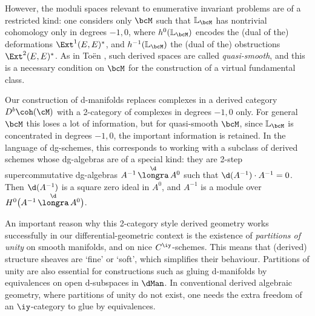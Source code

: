\documentclass{article}
\begin{document}
However, the moduli spaces relevant to enumerative invariant
problems are of a restricted kind: one considers only $\bcM$ such
that ${\mathbb L}_\bcM$ has nontrivial cohomology only in degrees
$-1,0$, where $h^0({\mathbb L}_\bcM)$ encodes the (dual of the)
deformations $\Ext^1(E,E)^*$, and $h^{-1}({\mathbb L}_\bcM)$ the
(dual of the) obstructions $\Ext^2(E,E)^*$. As in To\"en \cite[\S
4.4.3]{Toen}, such derived spaces are called {\it
quasi-smooth}, and
this is a necessary condition on $\bcM$ for the construction of a
virtual fundamental class.

Our construction of d-manifolds replaces complexes in a derived
category $D^b\coh(\cM)$ with a 2-category of complexes in degrees
$-1,0$ only. For general $\bcM$ this loses a lot of information, but
for quasi-smooth $\bcM$, since ${\mathbb L}_\bcM$ is concentrated in
degrees $-1,0$, the important information is retained. In the
language of dg-schemes, this corresponds to working
with a subclass of derived schemes whose dg-algebras are of a
special kind: they are 2-step supercommutative dg-algebras
$A^{-1}\,{\buildrel\d\over \longra}\,A^0$ such that $\d(A^{-1})\cdot
A^{-1}=0$. Then $\d(A^{-1})$ is a square zero ideal in $A^0$, and
$A^{-1}$ is a module over~$H^0\bigl(A^{-1}\,{\buildrel
\d\over\longra}\,A^0\bigr)$.

An important reason why this 2-category style derived geometry works
successfully in our differential-geometric context is the existence
of {\it partitions of unity\/} on smooth
manifolds, and on nice $C^\iy$-schemes. This means that (derived)
structure sheaves are `fine' or `soft', which simplifies their
behaviour. Partitions of unity are also essential for constructions
such as gluing d-manifolds by equivalences on open d-subspaces in
$\dMan$. In conventional derived algebraic geometry, where
partitions of unity do not exist, one needs the extra freedom of an
$\iy$-category to glue by equivalences.
\end{document}
